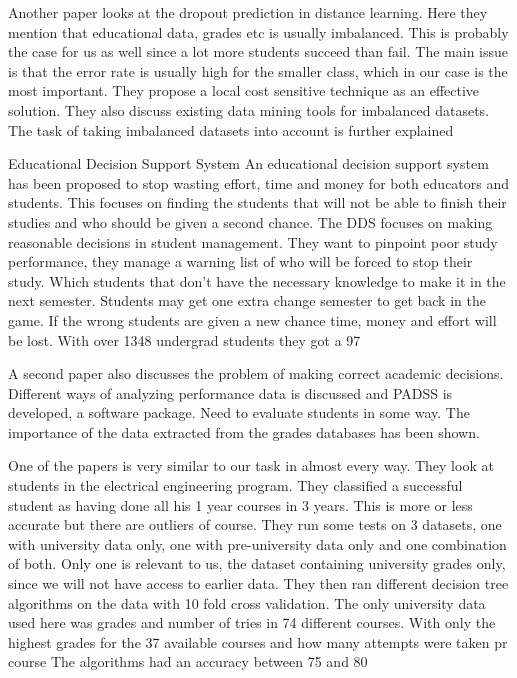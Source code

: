 Another paper looks at the dropout prediction in distance learning. Here they mention that educational data, grades etc is usually imbalanced. This is probably the case for us as well since a lot more students succeed than fail. The main issue is that the error rate is usually high for the smaller class, which in our case is the most important. They propose a local cost sensitive technique as an effective solution. They also discuss existing data mining tools for imbalanced datasets\cite{8,9,12}. The task of taking imbalanced datasets into account is further explained\cite{10}

Educational Decision Support System
An educational decision support system has been proposed\cite{5} to stop wasting effort, time and money for both educators and students. This focuses on finding the students that will not be able to finish their studies and who should be given a second chance. The DDS focuses on making reasonable decisions in student management. They want to pinpoint poor study performance, they manage a warning list of who will be forced to stop their study. Which students that don’t have the necessary knowledge to make it in the next semester. Students may get one extra change semester to get back in the game. If the wrong students are given a new chance time, money and effort will be lost. With over 1348 undergrad students they got a 97%

A second paper also discusses the problem of making correct academic decisions\cite{6}. Different ways of analyzing performance data is discussed and PADSS is developed, a software package. Need to evaluate students in some way. The importance of the data extracted from the grades databases has been shown. 

One of the papers is very similar to our task in almost every way\cite{7}. They look at students in the electrical engineering program. They classified a successful student as having done all his 1 year courses in 3 years. This is more or less accurate but there are outliers of course. They run some tests on 3 datasets, one with university data only, one with pre-university data only and one combination of both. Only one is relevant to us, the dataset containing university grades only, since we will not have access to earlier data. They then ran different decision tree algorithms on the data with 10 fold cross validation. The only university data used here was grades and number of tries in 74 different courses. With only the highest grades for the 37 available courses and how many attempts were taken pr course The algorithms had an accuracy between 75 and 80%

